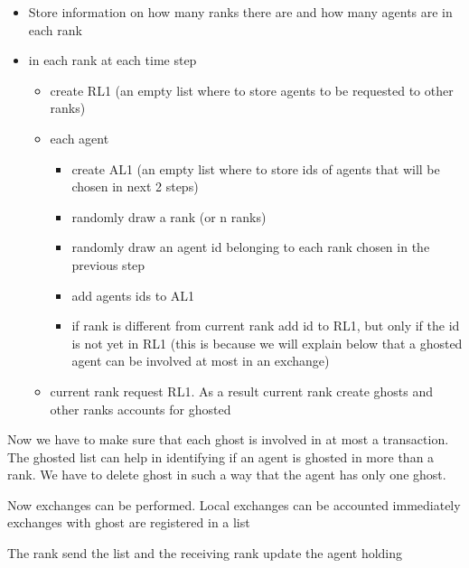 \documentclass{article}
\providecommand{\tightlist}{%
  \setlength{\itemsep}{0pt}\setlength{\parskip}{0pt}}
\begin{document}
\begin{itemize}
\tightlist
\item
  Store information on how many ranks there are and how many agents are
  in each rank
\item
  in each rank at each time step

  \begin{itemize}
  \tightlist
  \item
    create RL1 (an empty list where to store agents to be requested to
    other ranks)
  \item
    each agent

    \begin{itemize}
    \tightlist
    \item
      create AL1 (an empty list where to store ids of agents that will
      be chosen in next 2 steps)
    \item
      randomly draw a rank (or n ranks)
    \item
      randomly draw an agent id belonging to each rank chosen in the
      previous step
    \item
      add agents ids to AL1
    \item
      if rank is different from current rank add id to RL1, but only if
      the id is not yet in RL1 (this is because we will explain below
      that a ghosted agent can be involved at most in an exchange)
    \end{itemize}
  \item
    current rank request RL1. As a result current rank create ghosts and
    other ranks accounts for ghosted
  \end{itemize}
\end{itemize}

Now we have to make sure that each ghost is involved in at most a
transaction. The ghosted list can help in identifying if an agent is
ghosted in more than a rank. We have to delete ghost in such a way that
the agent has only one ghost.

Now exchanges can be performed. Local exchanges can be accounted
immediately exchanges with ghost are registered in a list

The rank send the list and the receiving rank update the agent holding
\end{document}
